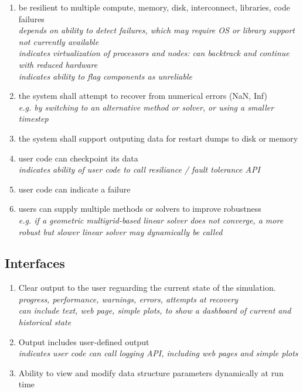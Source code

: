 \documentclass{article}
\begin{document}
\begin{enumerate}
    \item be resilient to multiple compute, memory, disk, interconnect, libraries, code failures
      \\ \textit{depends on ability to detect failures, which may require OS or
      library support not currently available }
      \\ \textit{indicates virtualization of processors and nodes: can backtrack
          and continue with reduced hardware }
      \\ \textit{indicates ability to flag components as unreliable }
    \item the system shall attempt to recover from numerical errors (NaN, Inf)
      \\ \textit{e.g. by switching to an alternative method or solver, or using a smaller timestep}
    \item the system shall support outputing data for restart dumps to disk or memory
    \item user code can checkpoint its data
      \\ \textit{indicates ability of user code to call resiliance / fault tolerance API }
    \item user code can indicate a failure
    \item users can supply multiple methods or solvers to improve robustness
      \\ \textit{e.g. if a geometric multigrid-based linear solver does not converge, a more robust but slower linear solver may dynamically be called }
\end{enumerate}

\subsection{Interfaces}

\begin{enumerate}
    \item Clear output to the user reguarding the current state of the simulation.
     \\ \textit{ progress, performance, warnings, errors, attempts at recovery }
     \\ \textit{ can include text, web page, simple plots, to show a dashboard of current
        and historical state }
    \item Output includes user-defined output
     \\ \textit{indicates user code can call logging API, including web pages and simple plots }
    \item Ability to view and modify data structure parameters dynamically at run time
\end{enumerate}
\end{document}
